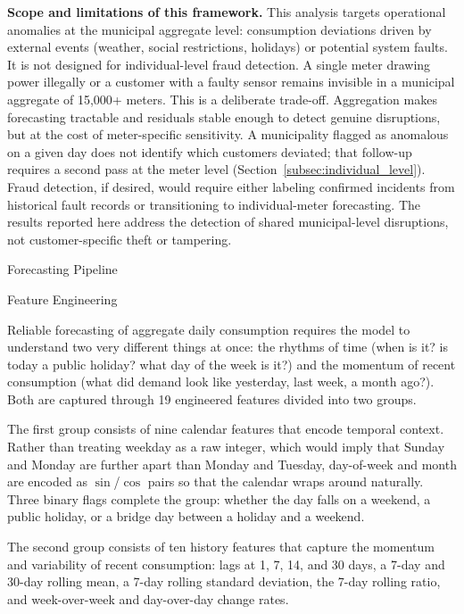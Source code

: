 ﻿\documentclass[12pt,reqno, twoside]{amsbook}
\makeatletter
\numberwithin{figure}{chapter}
\numberwithin{table}{chapter}
\numberwithin{equation}{chapter}
\def\section{\@startsection{section}{1}%
      \z@{.5\linespacing\@plus.7\linespacing}{.25\linespacing}%
      {\normalfont\bfseries\flushleft}}
\def\subsection{\@startsection{subsection}{2}%
      \z@{.5\linespacing\@plus.7\linespacing}{.25\linespacing}%
      {\normalfont\bfseries\flushleft}}
\theoremstyle{plain}
\numberwithin{equation}{chapter}
\numberwithin{section}{chapter}
\makeatother
\begin{document}
\textbf{Scope and limitations of this framework.} This analysis targets operational anomalies at the municipal aggregate level: consumption deviations driven by external events (weather, social restrictions, holidays) or potential system faults. It is not designed for individual-level fraud detection. A single meter drawing power illegally or a customer with a faulty sensor remains invisible in a municipal aggregate of 15,000+ meters. This is a deliberate trade-off. Aggregation makes forecasting tractable and residuals stable enough to detect genuine disruptions, but at the cost of meter-specific sensitivity. A municipality flagged as anomalous on a given day does not identify which customers deviated; that follow-up requires a second pass at the meter level (Section~\ref{subsec:individual_level}). Fraud detection, if desired, would require either labeling confirmed incidents from historical fault records or transitioning to individual-meter forecasting. The results reported here address the detection of shared municipal-level disruptions, not customer-specific theft or tampering.

\section{Forecasting Pipeline}
\label{sec:forecasting}

\subsection{Feature Engineering}

Reliable forecasting of aggregate daily consumption requires the model to understand two very different things at once: the rhythms of time (when is it? is today a public holiday? what day of the week is it?) and the momentum of recent consumption (what did demand look like yesterday, last week, a month ago?). Both are captured through 19 engineered features divided into two groups.

The first group consists of nine calendar features that encode temporal context. Rather than treating weekday as a raw integer, which would imply that Sunday and Monday are further apart than Monday and Tuesday, day-of-week and month are encoded as $\sin$/$\cos$ pairs so that the calendar wraps around naturally. Three binary flags complete the group: whether the day falls on a weekend, a public holiday, or a bridge day between a holiday and a weekend.

The second group consists of ten history features that capture the momentum and variability of recent consumption: lags at 1, 7, 14, and 30 days, a 7-day and 30-day rolling mean, a 7-day rolling standard deviation, the 7-day rolling ratio, and week-over-week and day-over-day change rates.
\end{document}
